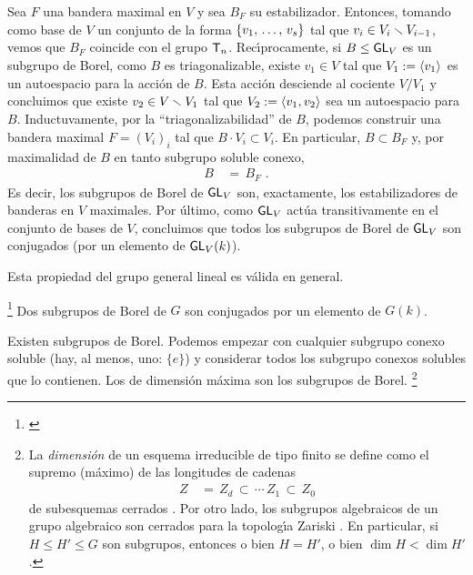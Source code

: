 Sea $F$ una bandera maximal en $V$ y sea $B_F$ su estabilizador. Entonces,
tomando como base de $V$ un conjunto de la forma $\{\lista{v}{s}\}$ tal que
$v_i\in V_i\setmin V_{i-1}$, vemos que $B_F$ coincide con el grupo
$\triangulares[n]$. Rec\'{\i}procamente, si $B\leq\GL[V]$ es un subgrupo de
Borel, como $B$ es triagonalizable, existe $v_1\in V$ tal que
$V_1:=\generado{v_1}$ es un autoespacio para la acci\'{o}n de $B$. Esta
acci\'{o}n desciende al cociente $V/V_1$ y concluimos que existe
$v_2\in V\setmin V_1$ tal que $V_2:=\generado{v_1,v_2}$ sea un autoespacio para
$B$. Inductuvamente, por la ``triagonalizabilidad'' de $B$, podemos construir
una bandera maximal $F=(V_i)_i$ tal que $B\cdot V_i\subset V_i$. En particular,
$B\subset B_F$ y, por maximalidad de $B$ en tanto subgrupo soluble conexo,
\begin{align*}
	B & \,=\, B_F
	\text{ .}
\end{align*}
%
Es decir, los subgrupos de Borel de $\GL[V]$ son, exactamente, los
estabilizadores de banderas en $V$ maximales. Por \'{u}ltimo, como $\GL[V]$
act\'{u}a transitivamente en el conjunto de bases de $V$, concluimos que todos
los subgrupos de Borel de $\GL[V]$ son conjugados (por un elemento de
$\GL[V](k)$).

Esta propiedad del grupo general lineal es v\'{a}lida en general.

\begin{teoBorelConjugados}\label{thm:borelconjugados}
	\footnote{
		\cite[Theorem~17.9]{MilneAlgebraicGroups}
	}
	Dos subgrupos de Borel de $G$ son conjugados por un elemento de $G(k)$.
\end{teoBorelConjugados}

\begin{obsBorel}\label{obs:borel:existencia}
	Existen subgrupos de Borel. Podemos empezar con cualquier subgrupo
	conexo soluble (hay, al menos, uno: $\{e\}$) y considerar todos los
	subgrupo conexos solubles que lo contienen. Los de dimensi\'{o}n
	m\'{a}xima son los subgrupos de Borel.%
	\footnote{
		La \emph{dimensi\'{o}n} de un esquema irreducible de tipo
		finito se define como el supremo (m\'{a}ximo) de las longitudes
		de cadenas
		\begin{align*}
			Z & \,=\,Z_d\,\subset\,\cdots\,Z_1\,\subset\,Z_0
		\end{align*}
		de subesquemas cerrados \cite[\S~A.24]{MilneAlgebraicGroups}.
		Por otro lado, los subgrupos algebraicos de un grupo algebraico
		son cerrados para la topolog\'{\i}a Zariski
		\cite[Proposition~1.41]{MilneAlgebraicGroups}. En particular,
		si $H\leq H'\leq G$ son subgrupos, entonces o bien $H=H'$, o
		bien $\dim H<\dim{H'}$.
	}
\end{obsBorel}

